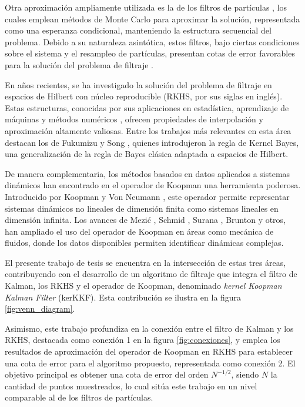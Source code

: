 Otra aproximación ampliamente utilizada es la de los filtros de partículas \cite{Hammersley1954PoorCarlo, Liu1998SequentialSystems}, los cuales emplean métodos de Monte Carlo para aproximar la solución, representada como una esperanza condicional, manteniendo la estructura secuencial del problema. Debido a su naturaleza asintótica, estos filtros, bajo ciertas condiciones sobre el sistema y el resampleo de partículas, presentan cotas de error favorables para la solución del problema de filtraje \cite{Crisan2002APractitioners}.

En años recientes, se ha investigado la solución del problema de filtraje en espacios de Hilbert con núcleo reproducible (RKHS, por sus siglas en inglés). Estas estructuras, conocidas por sus aplicaciones en estadística, aprendizaje de máquinas y métodos numéricos \cite{Wendland2004ScatteredApproximation, Christmann2008SupportMachines}, ofrecen propiedades de interpolación y aproximación altamente valiosas. Entre los trabajos más relevantes en esta área destacan los de Fukumizu y Song \cite{Fukumizu2004DimensionalitySpaces, Song2009HilbertSystems}, quienes introdujeron la regla de Kernel Bayes, una generalización de la regla de Bayes clásica adaptada a espacios de Hilbert.

De manera complementaria, los métodos basados en datos aplicados a sistemas dinámicos han encontrado en el operador de Koopman una herramienta poderosa. Introducido por Koopman y Von Neumann \cite{Koopman1931HamiltonianSpace, Koopman1932DynamicalSpectra}, este operador permite representar sistemas dinámicos no lineales de dimensión finita como sistemas lineales en dimensión infinita. Los avances de Mezić \cite{Mezic2013AnalysisOperator}, Schmid \cite{Schmid2008DynamicData}, Surana \cite{Surana2016KoopmanSystems}, Brunton \cite{Brunton2016KoopmanControl} y otros, han ampliado el uso del operador de Koopman en áreas como mecánica de fluidos, donde los datos disponibles permiten identificar dinámicas complejas.

El presente trabajo de tesis se encuentra en la intersección de estas tres áreas, contribuyendo con el desarrollo de un algoritmo de filtraje que integra el filtro de Kalman, los RKHS y el operador de Koopman, denominado \textit{kernel Koopman Kalman Filter} (kerKKF). Esta contribución se ilustra en la figura \ref{fig:venn_diagram}.

Asimismo, este trabajo profundiza en la conexión entre el filtro de Kalman y los RKHS, destacada como conexión 1 en la figura \ref{fig:conexiones}, y emplea los resultados de aproximación del operador de Koopman en RKHS para establecer una cota de error para el algoritmo propuesto, representada como conexión 2. El objetivo principal es obtener una cota de error del orden $N^{-1/2}$, siendo $N$ la cantidad de puntos muestreados, lo cual sitúa este trabajo en un nivel comparable al de los filtros de partículas.

